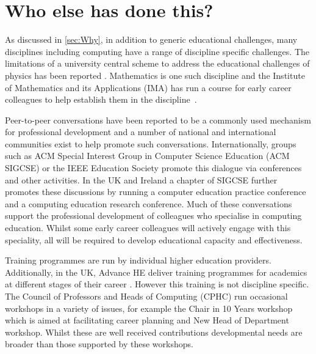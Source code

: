 \documentclass[sigconf]{acmart}
\begin{document}
\section{Who else has done this?}
As discussed in \ref{sec:Why}, in addition to generic educational
challenges, many disciplines including computing have a range of
discipline specific challenges. The limitations of a university
central scheme to address the educational challenges of physics has
been reported \cite{Magueijo2009}.  Mathematics is one such discipline
and the Institute of Mathematics and its Applications (IMA) has run a
course for early career colleagues to help establish them in the
discipline~\cite{IMA}.

Peer-to-peer conversations have been reported to be a commonly used
mechanism for professional development \cite{King2004} and a number of
national and international communities exist to help promote such
conversations. Internationally, groups such as ACM Special Interest
Group in Computer Science Education (ACM SIGCSE) or the IEEE Education
Society promote this dialogue via conferences and other activities.
In the UK and Ireland a chapter of SIGCSE further promotes these
discussions by running a computer education practice conference and a
computing education research conference. Much of these conversations
support the professional development of colleagues who specialise in
computing education. Whilst some early career colleagues will actively
engage with this speciality, all will be required to develop
educational capacity and effectiveness.
 
Training programmes are run by individual higher education
providers. Additionally, in the UK, Advance HE deliver training
programmes for academics at different stages of their career
\cite{HEATraining}. However this training is not discipline
specific. The Council of Professors and Heads of Computing (CPHC) run
occasional workshops in a variety of issues, for example the Chair in
10 Years workshop which is aimed at facilitating career planning and
New Head of Department workshop. Whilst these are well received
contributions developmental needs are broader than those supported by
these workshops.

\end{document}
